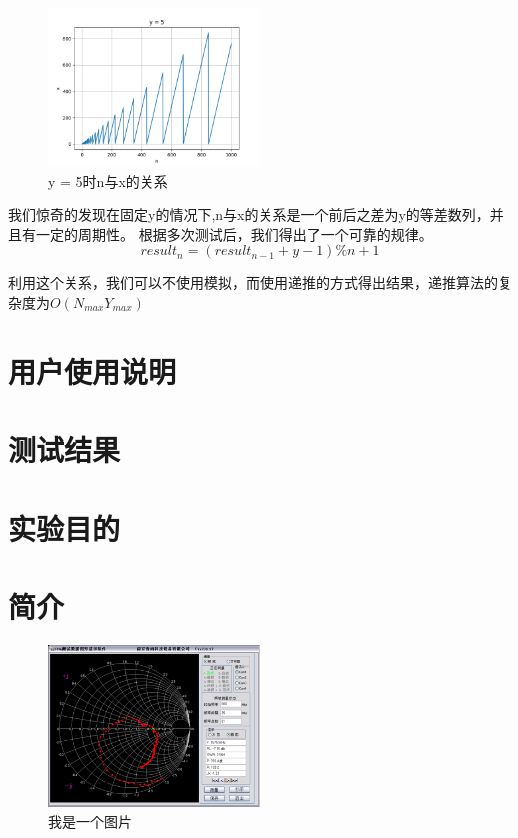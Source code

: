    \begin{figure}[H]
      \centering
      \includegraphics[width=0.5\textwidth]{images/y5.png}
      \caption{y = 5时n与x的关系}
   \end{figure}


   我们惊奇的发现在固定y的情况下,n与x的关系是一个前后之差为y的等差数列，并且有一定的周期性。
   根据多次测试后，我们得出了一个可靠的规律。
   $$ result_{n} = (result_{n-1} + y - 1) \% n + 1 $$

   利用这个关系，我们可以不使用模拟，而使用递推的方式得出结果，递推算法的复杂度为$O(N_{max}Y_{max})$

\section{用户使用说明}

\section{测试结果}

\section{实验目的}

\section{简介}

\begin{figure}[H]
\centering
\includegraphics[width=0.5\textwidth]{images/pic1.png}
\caption{我是一个图片}
\end{figure}
